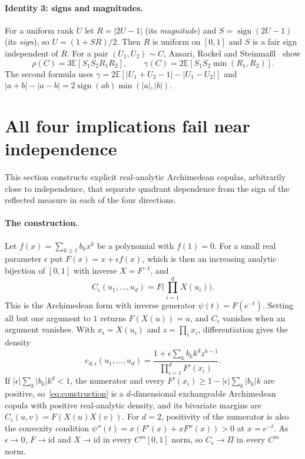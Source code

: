\documentclass[11pt,a4paper]{article}
\theoremstyle{remark}
\newcommand{\EE}{\mathbb{E}}
\DeclareMathOperator{\sgn}{sign}
\begin{document}
\paragraph{Identity 3: signs and magnitudes.} For a uniform rank $U$ let $R=|2U-1|$ (its \emph{magnitude}) and $S=\sgn(2U-1)$ (its \emph{sign}), so $U=(1+SR)/2$. Then $R$ is uniform on $[0,1]$ and $S$ is a fair sign independent of $R$. For a pair $(U_1,U_2)\sim C$, Ansari, Rockel and Steinma{\ss}l~\cite[Lemma~3.1]{ars} show
\begin{equation}
 \rho(C)=3\EE[S_1S_2R_1R_2],\qquad\gamma(C)=2\EE[S_1S_2\min(R_1,R_2)].\label{eq:signmag}
\end{equation}
The second formula uses $\gamma=2\EE[|U_1+U_2-1|-|U_1-U_2|]$ and $|a+b|-|a-b|=2\sgn(ab)\min(|a|,|b|)$.

\section{All four implications fail near independence}\label{sec:local}
This section constructs explicit real-analytic Archimedean copulas, arbitrarily close to independence, that separate quadrant dependence from the sign of the reflected measure in each of the four directions.

\paragraph{The construction.} Let $f(x)=\sum_{k\geq1}b_kx^k$ be a polynomial with $f(1)=0$. For a small real parameter $\epsilon$ put $F(x)=x+\epsilon f(x)$, which is then an increasing analytic bijection of $[0,1]$ with inverse $X=F^{-1}$, and
\begin{equation}
 C_\epsilon(u_1,\ldots,u_d)=F\Big(\prod_{i=1}^dX(u_i)\Big).\label{eq:construction}
\end{equation}
This is the Archimedean form with inverse generator $\psi(t)=F(e^{-t})$. Setting all but one argument to $1$ returns $F(X(u))=u$, and $C_\epsilon$ vanishes when an argument vanishes. With $x_i=X(u_i)$ and $z=\prod_ix_i$, differentiation gives the density
\begin{equation}
 c_{d,\epsilon}(u_1,\ldots,u_d)=\frac{1+\epsilon\sum_kb_kk^dz^{k-1}}{\prod_{i=1}^dF'(x_i)}.\label{eq:density}
\end{equation}
If $|\epsilon|\sum_k|b_k|k^d<1$, the numerator and every $F'(x_i)\geq1-|\epsilon|\sum_k|b_k|k$ are positive, so~\eqref{eq:construction} is a $d$-dimensional exchangeable Archimedean copula with positive real-analytic density, and its bivariate margins are $C_\epsilon(u,v)=F(X(u)X(v))$. For $d=2$, positivity of the numerator is also the convexity condition $\psi''(t)=x(F'(x)+xF''(x))>0$ at $x=e^{-t}$. As $\epsilon\to0$, $F\to\mathrm{id}$ and $X\to\mathrm{id}$ in every $C^m[0,1]$ norm, so $C_\epsilon\to\Pi$ in every $C^m$ norm.
\end{document}

